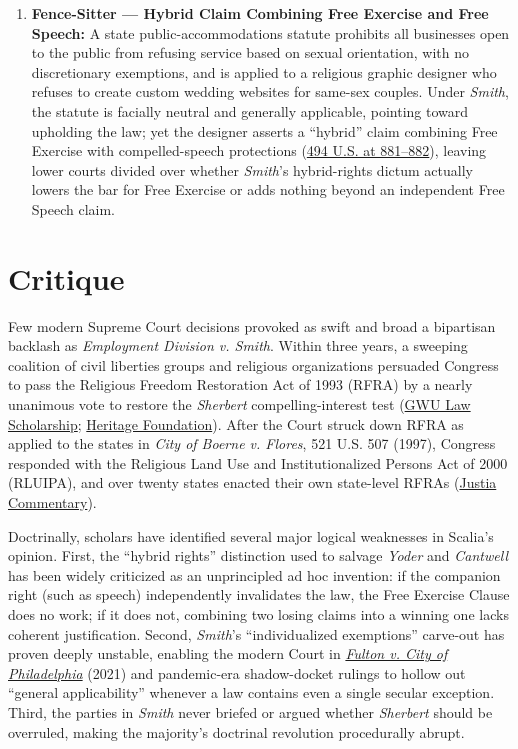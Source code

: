 \documentclass[12pt]{article}
\begin{document}
\begin{enumerate}
  \item \textbf{Fence-Sitter --- Hybrid Claim Combining Free Exercise and Free Speech:} A state public-accommodations statute prohibits all businesses open to the public from refusing service based on sexual orientation, with no discretionary exemptions, and is applied to a religious graphic designer who refuses to create custom wedding websites for same-sex couples. Under \textit{Smith}, the statute is facially neutral and generally applicable, pointing toward upholding the law; yet the designer asserts a ``hybrid'' claim combining Free Exercise with compelled-speech protections (\href{https://supreme.justia.com/cases/federal/us/494/872/}{494 U.S. at 881--882}), leaving lower courts divided over whether \textit{Smith}'s hybrid-rights dictum actually lowers the bar for Free Exercise or adds nothing beyond an independent Free Speech claim.
\end{enumerate}

\section{Critique}

Few modern Supreme Court decisions provoked as swift and broad a bipartisan backlash as \textit{Employment Division v. Smith}. Within three years, a sweeping coalition of civil liberties groups and religious organizations persuaded Congress to pass the Religious Freedom Restoration Act of 1993 (RFRA) by a nearly unanimous vote to restore the \textit{Sherbert} compelling-interest test (\href{https://scholarship.law.gwu.edu/cgi/viewcontent.cgi?article=2806&context=faculty_publications}{GWU Law Scholarship}; \href{https://www.heritage.org/religious-liberty/report/the-religious-freedom-restoration-act-turns-30-the-most-precious-all}{Heritage Foundation}). After the Court struck down RFRA as applied to the states in \textit{City of Boerne v. Flores}, 521 U.S. 507 (1997), Congress responded with the Religious Land Use and Institutionalized Persons Act of 2000 (RLUIPA), and over twenty states enacted their own state-level RFRAs (\href{https://supreme.justia.com/cases/federal/us/494/872/}{Justia Commentary}).

Doctrinally, scholars have identified several major logical weaknesses in Scalia's opinion. First, the ``hybrid rights'' distinction used to salvage \textit{Yoder} and \textit{Cantwell} has been widely criticized as an unprincipled ad hoc invention: if the companion right (such as speech) independently invalidates the law, the Free Exercise Clause does no work; if it does not, combining two losing claims into a winning one lacks coherent justification. Second, \textit{Smith}'s ``individualized exemptions'' carve-out has proven deeply unstable, enabling the modern Court in \href{https://www.scotusblog.com/cases/fulton-v-city-of-philadelphia-pennsylvania/}{\textit{Fulton v. City of Philadelphia}} (2021) and pandemic-era shadow-docket rulings to hollow out ``general applicability'' whenever a law contains even a single secular exception. Third, the parties in \textit{Smith} never briefed or argued whether \textit{Sherbert} should be overruled, making the majority's doctrinal revolution procedurally abrupt.
\end{document}

